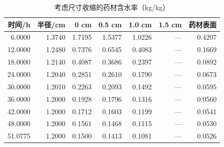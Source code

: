 \begin{table}[htbp]
\centering
\caption{考虑尺寸收缩的药材含水率（kg/kg）}
\label{tab:q4-moisture}
\begin{tabular}{rrrrrrr}
\toprule
时间/h & 半径/cm & 0 cm & 0.5 cm & 1.0 cm & 1.5 cm & 药材表面\\
\midrule
6.0000 & 1.3740 & 1.7195 & 1.5377 & 1.0226 & --- & 0.4207\\
12.0000 & 1.2480 & 0.7376 & 0.6545 & 0.4083 & --- & 0.1669\\
18.0000 & 1.2140 & 0.4087 & 0.3686 & 0.2397 & --- & 0.0892\\
24.0000 & 1.2040 & 0.2851 & 0.2610 & 0.1790 & --- & 0.0673\\
30.0000 & 1.2010 & 0.2263 & 0.2093 & 0.1492 & --- & 0.0595\\
36.0000 & 1.2000 & 0.1928 & 0.1796 & 0.1316 & --- & 0.0560\\
42.0000 & 1.2000 & 0.1712 & 0.1603 & 0.1199 & --- & 0.0541\\
48.0000 & 1.2000 & 0.1561 & 0.1468 & 0.1115 & --- & 0.0530\\
51.0775 & 1.2000 & 0.1500 & 0.1413 & 0.1081 & --- & 0.0526\\
\bottomrule
\end{tabular}
\par{}
\end{table}